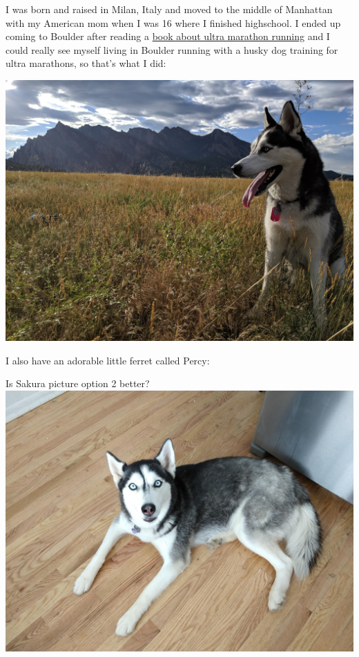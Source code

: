 \documentclass[
]{book}
\begin{document}
I was born and raised in Milan, Italy and moved to the middle of Manhattan with my American mom when I was 16 where I finished highschool. I ended up coming to Boulder after reading a \href{http://www.scottjurek.com/eat-run}{book about ultra marathon running} and I could really see myself living in Boulder running with a husky dog training for ultra marathons, so that's what I did:

\includegraphics{images/sakura_option1.jpg}

I also have an adorable little ferret called Percy:

Is Sakura picture option 2 better?
\includegraphics{images/sakura_option2.jpg}
\end{document}
